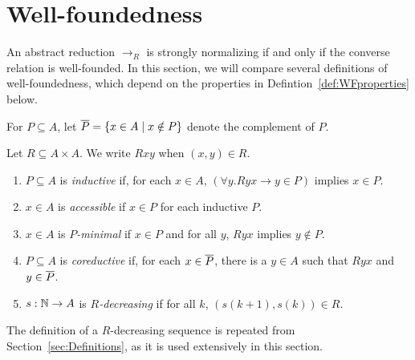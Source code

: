 \section{Well-foundedness}

\newcommand{\then}{\Longrightarrow}
\label{sec:Well-foundedness}



An abstract reduction $\to_R$ is strongly normalizing
if and only if the converse relation is well-founded.
In this section, we will compare several definitions of well-foundedness, which depend on the properties in Defintion~\ref{def:WFproperties} below. 

For $P \subseteq A$, let $\overline{P} = \{ x \in A \mid x \notin P\}$ denote the complement of $P$.
\begin{definition}\label{def:WFproperties}
  Let $R \subseteq A \times A$.  We write $Rxy$ when $(x,y) \in R$.
  \begin{enumerate}
    \item $P \subseteq A$ is \emph{inductive}
    if, for each $x \in A$, $(\forall y. Ryx \to y \in P)$ implies $x \in P$.

    \item $x \in A$ is \emph{accessible} if $x \in P$ for each inductive $P$.

    \item $x \in A$ is \emph{$P$-minimal} if $x \in P$ and for all $y$,
    $Ryx$ implies $y \notin P$.

    \item $P \subseteq A$ is \emph{coreductive} if, for each $x \in \overline{P}$, there is a $y \in A$ such that $Ryx$ and $y \in \overline{P}$. 
    
    \item $s : \mathbb{N} \to A$ is \emph{$R$-decreasing} if for all $k$, $(s(k+1),s(k)) \in R$. 
  \end{enumerate}
\end{definition}
The definition of a $R$-decreasing sequence is repeated from Section~\ref{sec:Definitions}, as it is used extensively in this section. 

